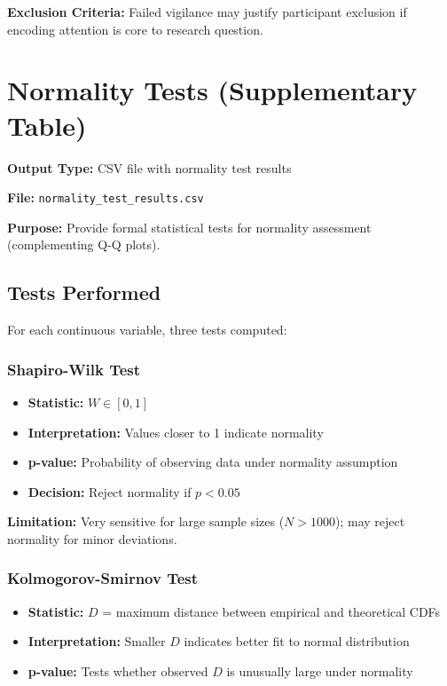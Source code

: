 \documentclass[12pt,a4paper]{article}
\begin{document}
\textbf{Exclusion Criteria:} Failed vigilance may justify participant exclusion if encoding attention is core to research question.

\newpage
\section{Normality Tests (Supplementary Table)}

\textbf{Output Type:} CSV file with normality test results

\textbf{File:} \texttt{normality\_test\_results.csv}

\textbf{Purpose:} Provide formal statistical tests for normality assessment (complementing Q-Q plots).

\subsection{Tests Performed}

For each continuous variable, three tests computed:

\subsubsection{Shapiro-Wilk Test}
\begin{itemize}
    \item \textbf{Statistic:} $W \in [0,1]$
    \item \textbf{Interpretation:} Values closer to 1 indicate normality
    \item \textbf{p-value:} Probability of observing data under normality assumption
    \item \textbf{Decision:} Reject normality if $p < 0.05$
\end{itemize}

\textbf{Limitation:} Very sensitive for large sample sizes ($N > 1000$); may reject normality for minor deviations.

\subsubsection{Kolmogorov-Smirnov Test}
\begin{itemize}
    \item \textbf{Statistic:} $D$ = maximum distance between empirical and theoretical CDFs
    \item \textbf{Interpretation:} Smaller $D$ indicates better fit to normal distribution
    \item \textbf{p-value:} Tests whether observed $D$ is unusually large under normality
\end{itemize}
\end{document}
